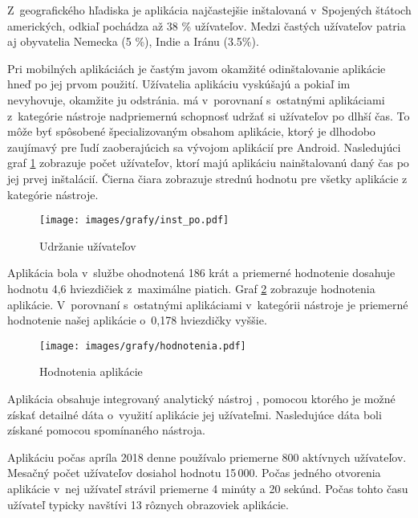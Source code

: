 Z~geografického hľadiska je aplikácia najčastejšie inštalovaná v~Spojených štátoch amerických, odkiaľ pochádza až 38 \% užívateľov. Medzi častých užívateľov patria aj obyvatelia Nemecka (5 \%), Indie a Iránu (3.5\%). 

Pri mobilných aplikáciách je častým javom okamžité odinštalovanie aplikácie hneď po jej prvom použití. Užívatelia aplikáciu vyskúšajú a pokiaľ im nevyhovuje, okamžite ju odstránia.  má v~porovnaní s~ostatnými aplikáciami z~kategórie nástroje nadpriemernú schopnosť udržať si užívateľov po dlhší čas. To môže byť spôsobené špecializovaným obsahom aplikácie, ktorý je dlhodobo zaujímavý pre ľudí zaoberajúcich sa vývojom aplikácií pre Android. Nasledujúci graf \ref{fig:inst-po} zobrazuje počet užívateľov, ktorí majú aplikáciu nainštalovanú daný čas po jej prvej inštalácií. Čierna čiara zobrazuje strednú hodnotu pre všetky aplikácie z kategórie nástroje. 

\begin{figure}[H]
  \begin{center}
    \texttt{[image: images/grafy/inst\_po.pdf]}
  \end{center}
  \caption{Udržanie užívateľov}
  \label{fig:inst-po}
\end{figure}


Aplikácia bola v~službe  ohodnotená 186 krát a priemerné hodnotenie dosahuje hodnotu 4,6 hviezdičiek z~maximálne piatich. Graf \ref{fig:hodnotenia} zobrazuje hodnotenia aplikácie. V~porovnaní s~ostatnými aplikáciami v~kategórii nástroje je priemerné hodnotenie našej aplikácie o~0,178 hviezdičky vyššie.

\begin{figure}[htb]
  \begin{center}
    \texttt{[image: images/grafy/hodnotenia.pdf]}
  \end{center}
  \caption{Hodnotenia aplikácie}
  \label{fig:hodnotenia}
\end{figure}


Aplikácia obsahuje integrovaný analytický nástroj , pomocou ktorého je možné získať detailné dáta o~využití aplikácie jej užívateľmi. Nasledujúce dáta boli získané pomocou spomínaného nástroja.

Aplikáciu počas apríla 2018 denne používalo priemerne 800 aktívnych užívateľov. Mesačný počet užívateľov dosiahol hodnotu 15\,000. Počas jedného otvorenia aplikácie v~nej užívateľ strávil priemerne 4 minúty a 20 sekúnd. Počas tohto času užívateľ typicky navštívi 13 rôznych obrazoviek aplikácie. 

